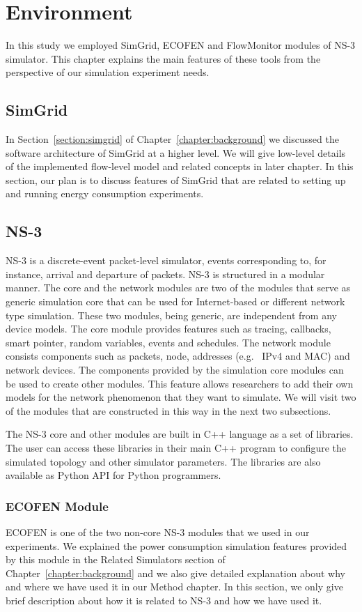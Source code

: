 \chapter{Environment}
\label{chapter:environment}
In this study we employed SimGrid, ECOFEN and FlowMonitor modules of NS-3 simulator. This chapter explains the main features of these tools from the perspective of our simulation experiment needs.

\section{SimGrid}
In Section~\ref{section:simgrid} of Chapter~\ref{chapter:background} we discussed the software architecture of SimGrid at a higher level. We will give low-level details of the implemented flow-level model and related concepts in later chapter. In this section, our plan is to discuss features of SimGrid that are related to setting up and running energy consumption experiments.

\section{NS-3}
NS-3 is a discrete-event packet-level simulator, events corresponding to, for instance, arrival and departure of packets. NS-3 is structured in a modular manner. The core and the network modules are two of the modules that serve as generic simulation core that can be used for Internet-based or different network type simulation. These two modules, being generic, are independent from any device models. The core module provides features such as tracing, callbacks, smart pointer, random variables, events and schedules. The network module consists components such as packets, node, addresses (e.g.{\ } IPv4 and MAC) and network devices. The components provided by the simulation core modules can be used to create other modules. This feature allows researchers to add their own models for the network phenomenon that they want to simulate. We will visit two of the modules that are constructed in this way in the next two subsections\cite{ns3}. 

The NS-3 core and other modules are built in C++ language as a set of libraries. The user can access these libraries in their main C++ program to configure the simulated topology and other simulator parameters. The libraries are also available as Python API for Python programmers. 


\subsection{ECOFEN Module}
ECOFEN is one of the two non-core NS-3 modules that we used in our experiments. We explained the power consumption simulation features provided by this module in the Related Simulators section of Chapter~\ref{chapter:background} and we also give detailed explanation about why and where we have used it in our Method chapter. In this section, we only give brief description about how it is related to NS-3 and how we have used it. 


